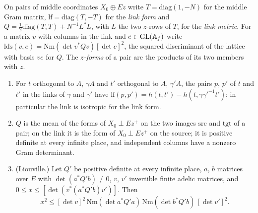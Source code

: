 On pairs of middle coordinates $X_0\oplus Ez$ write $T=\mathrm{diag}(1,-N)$ for the middle Gram matrix, $\mathrm{lf}=\mathrm{diag}(T,-T)$ for the \emph{link form} and
$Q=\frac12\mathrm{diag}(T,T)+N^{-1}L^*L$, with $L$ the two $z$-rows of $T$, for the \emph{link metric}. For a matrix $v$ with columns in the link and $e\in\operatorname{GL}(\mathbb{A}_f)$ write $\mathrm{lds}(v,e)=\mathrm{Nm}(\det v^*Qv)[\det e]^2$, the
squared discriminant of the lattice with basis $ve$ for $Q$. The \emph{$z$-forms} of a pair are the products of its two members with $z$.

\begin{lemma}\label{lem:liouville}
\begin{enumerate}[label=\textup{(\alph*)}]
\item For $t$ orthogonal to $A$, $\gamma A$ and $t'$ orthogonal to $A$, $\gamma'A$, the pairs $p$, $p'$ of $t$ and $t'$ in the links of $\gamma$ and $\gamma'$ have $\mathrm{lf}(p,p')=h(t,t')-h(t,\gamma\gamma'^{-1}t')$; in particular the link is
isotropic for the link form.
\item $Q$ is the mean of the forms of $X_0\perp Ez^+$ on the two images $\mathrm{src}$ and $\mathrm{tgt}$ of a pair; on the link it is the form of $X_0\perp Ez^+$ on the source; it is positive definite at every infinite
place, and independent columns have a nonzero Gram determinant.
\item (Liouville.) Let $Q'$ be positive definite at every infinite place, $a$, $b$ matrices over $E$ with $\det(a^*Q'b)\ne0$, $v$, $v'$ invertible finite adelic matrices, and $0\le x\le[\det(v^*(a^*Q'b)v')]$. Then
\[
  x^2\le[\det v]^2\,\mathrm{Nm}(\det a^*Q'a)\,\mathrm{Nm}(\det b^*Q'b)\,[\det v']^2.
\]
\end{enumerate}
\end{lemma}

